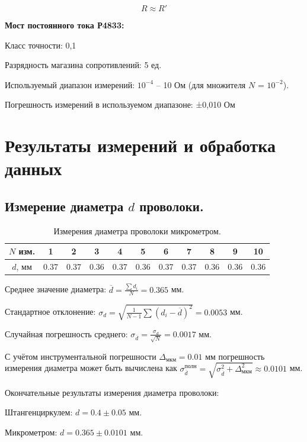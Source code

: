 \documentclass[a4paper, 12pt]{article}
\begin{document}
\[R \approx R'\]

\noindent \textbf{Мост постоянного тока Р4833:}

Класс точности: 0,1

Разрядность магазина сопротивлений: 5 ед.

Используемый диапазон измерений: $10^{-4}$ – 10 Ом (для множителя $N$ = $10^{-2}$).

Погрешность измерений в используемом диапазоне: ±0,010 Ом

\section*{Результаты измерений и обработка данных}

\subsection*{Измерение диаметра $d$ проволоки.}

\begin{table}[!h]
\begin{center}
\begin{tabular}{|c|c|c|c|c|c|c|c|c|c|c|}
\hline
$N$ изм. & 1 & 2 & 3 & 4 & 5 & 6 & 7 & 8 & 9 & 10 \\ \hline
$d$, мм & 0.37 & 0.37 & 0.36 & 0.37 & 0.36 & 0.37 & 0.37 & 0.36 & 0.36 & 0.36 \\ \hline 
\end{tabular}
\caption{Измерения диаметра проволоки микрометром.}
\end{center}
\end{table}

\clearpage

Среднее значение диаметра: $\overline{d}=\frac{\sum d_i}{N}=0.365$ мм.

Стандартное отклонение: $\sigma_d =\sqrt{\frac{1}{N-1}\sum{(d_i-\overline{d})}^2}=0.0053$ мм.

Случайная погрешность среднего: $\sigma_{\overline{d}}=\frac{\sigma_d}{\sqrt{N}}=0.0017$ мм.

С учётом инструментальной погрешности $\Delta_{\text{мкм}}=0.01$ мм погрешность измерения диаметра может быть вычислена как $\sigma^{\text{полн}}_{\overline{d}}=\sqrt{\sigma^2_{\overline{d}}+\Delta_{\text{мкм}}^2}\approx 0.0101$ мм.

Окончательные результаты измерения диаметра проволоки:

Штангенциркулем: $d=0.4 \pm 0.05$ мм.

Микрометром: $d=0.365 \pm 0.0101$ мм.
\end{document}
